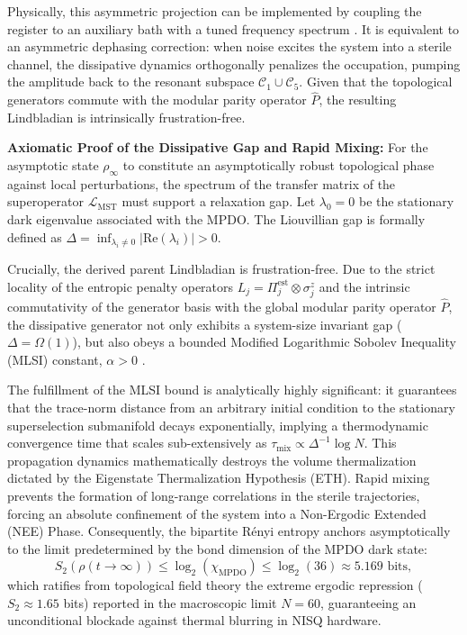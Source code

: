 \documentclass[reprint,aps,pra,superscriptaddress,nofootinbib]{revtex4-2}
\theoremstyle{plain}
\theoremstyle{definition}
\theoremstyle{remark}
\begin{document}
Physically, this asymmetric projection can be implemented by coupling the register to an auxiliary bath with a tuned frequency spectrum \cite{Liu2025}. It is equivalent to an asymmetric dephasing correction: when noise excites the system into a sterile channel, the dissipative dynamics orthogonally penalizes the occupation, pumping the amplitude back to the resonant subspace $\mathcal{C}_1 \cup \mathcal{C}_5$. Given that the topological generators commute with the modular parity operator $\hat{P}$, the resulting Lindbladian is intrinsically frustration-free.

\textbf{Axiomatic Proof of the Dissipative Gap and Rapid Mixing:}
For the asymptotic state $\rho_\infty$ to constitute an asymptotically robust topological phase against local perturbations, the spectrum of the transfer matrix of the superoperator $\mathcal{L}_{\text{MST}}$ must support a relaxation gap. Let $\lambda_0 = 0$ be the stationary dark eigenvalue associated with the MPDO. The Liouvillian gap is formally defined as $\Delta = \inf_{\lambda_i \neq 0} |\text{Re}(\lambda_i)| > 0$.

Crucially, the derived parent Lindbladian is frustration-free. Due to the strict locality of the entropic penalty operators $L_j = \Pi_j^{\text{est}} \otimes \sigma_j^z$ and the intrinsic commutativity of the generator basis with the global modular parity operator $\hat{P}$, the dissipative generator not only exhibits a system-size invariant gap ($\Delta = \Omega(1)$), but also obeys a bounded Modified Logarithmic Sobolev Inequality (MLSI) constant, $\alpha > 0$ \cite{Kastoryano2013}.

The fulfillment of the MLSI bound is analytically highly significant: it guarantees that the trace-norm distance from an arbitrary initial condition to the stationary superselection submanifold decays exponentially, implying a thermodynamic convergence time that scales sub-extensively as $\tau_{\text{mix}} \propto \Delta^{-1} \log N$.
This propagation dynamics mathematically destroys the volume thermalization dictated by the Eigenstate Thermalization Hypothesis (ETH). Rapid mixing prevents the formation of long-range correlations in the sterile trajectories, forcing an absolute confinement of the system into a Non-Ergodic Extended (NEE) Phase. Consequently, the bipartite Rényi entropy anchors asymptotically to the limit predetermined by the bond dimension of the MPDO dark state:
\begin{equation}
S_2(\rho(t \to \infty)) \le \log_2(\chi_{\text{MPDO}}) \le \log_2(36) \approx 5.169 \text{ bits},
\end{equation}
which ratifies from topological field theory the extreme ergodic repression ($S_2 \approx 1.65$ bits) reported in the macroscopic limit $N=60$, guaranteeing an unconditional blockade against thermal blurring in NISQ hardware.
\end{document}
